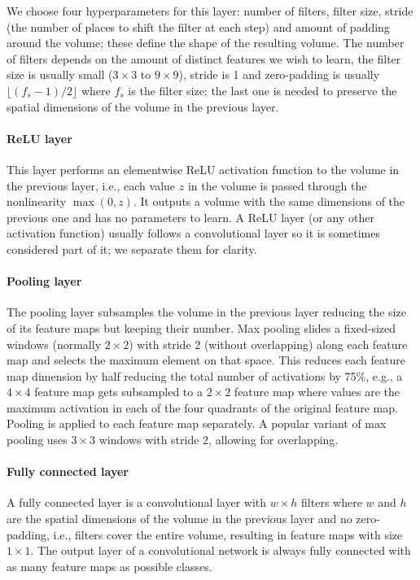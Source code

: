 We choose four hyperparameters for this layer: number of filters, filter size, stride (the number of places to shift the filter at each step) and amount of padding around the volume; these define the shape of the resulting volume. The number of filters depends on the amount of distinct features we wish to learn, the filter size is usually small ($3\times3$ to $9\times9$), stride is 1 and zero-padding is usually $\lfloor (f_s-1)/2\rfloor$ where $f_s$ is the filter size; the last one is needed to preserve the spatial dimensions of the volume in the previous layer.

\paragraph{ReLU layer} This layer performs an elementwise ReLU activation function to the volume in the previous layer, i.e., each value $z$ in the volume is passed through the nonlinearity $\max(0,z)$. It outputs a volume with the same dimensions of the previous one and has no parameters to learn. A ReLU layer (or any other activation function) usually follows a convolutional layer so it is sometimes considered part of it; we separate them for clarity. 

\paragraph{Pooling layer} The pooling layer subsamples the volume in the previous layer reducing the size of its feature maps but keeping their number. Max pooling slides a fixed-sized windows (normally $2\times2$) with stride 2 (without overlapping) along each feature map and selects the maximum element on that space. This reduces each feature map dimension by half reducing the total number of activations by 75\%, e.g., a $4\times4$ feature map gets subsampled to a $2\times 2$ feature map where values are the maximum activation in each of the four quadrants of the original feature map. Pooling is applied to each feature map separately. A popular variant of max pooling uses $3\times 3$ windows with stride 2, allowing for overlapping.

\paragraph{Fully connected layer} A fully connected layer is a convolutional layer with $w\times h$ filters where $w$ and $h$ are the spatial dimensions of the volume in the previous layer and no zero-padding, i.e., filters cover the entire volume, resulting in feature maps with size $1 \times 1$. The output layer of a convolutional network is always fully connected with as many feature maps as possible classes.%

